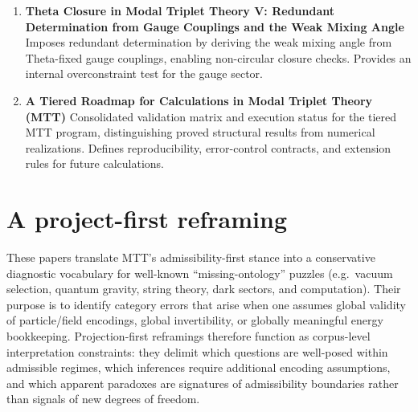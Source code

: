 \documentclass[11pt]{article}
\begin{document}
\begin{enumerate}[leftmargin=*]
\item \textbf{Theta Closure in Modal Triplet Theory V: Redundant Determination from Gauge Couplings and the Weak Mixing Angle} Imposes redundant determination by deriving the weak mixing angle from Theta-fixed gauge couplings, enabling non-circular closure checks. Provides an internal overconstraint test for the gauge sector.
\item \textbf{A Tiered Roadmap for Calculations in Modal Triplet Theory (MTT)} Consolidated validation matrix and execution status for the tiered MTT program, distinguishing proved structural results from numerical realizations. Defines reproducibility, error-control contracts, and extension rules for future calculations.
\end{enumerate}

\section{A project-first reframing}
These papers translate MTT’s admissibility-first stance into a conservative diagnostic vocabulary for
well-known “missing-ontology” puzzles (e.g.\ vacuum selection, quantum gravity, string theory, dark
sectors, and computation). Their purpose is to identify category errors that arise when one assumes
global validity of particle/field encodings, global invertibility, or globally meaningful energy bookkeeping.
Projection-first reframings therefore function as corpus-level interpretation constraints: they delimit
which questions are well-posed within admissible regimes, which inferences require additional encoding
assumptions, and which apparent paradoxes are signatures of admissibility boundaries rather than
signals of new degrees of freedom.
\end{document}

